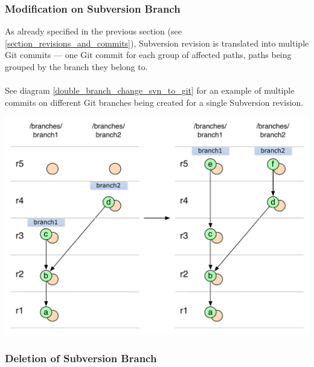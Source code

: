 \subsubsection{Modification on Subversion Branch}

As already specified in the previous section (see \ref{section_revisions_and_commits}), Subversion
revision is translated into multiple Git commits --- one Git commit for each group of 
affected paths, paths being grouped by the branch they belong to.
\\\\
See diagram \ref{double_branch_change_svn_to_git} for an example of multiple commits 
on different Git branches being created for a single Subversion revision.

\begin{center}
\includegraphics[width=\textwidth]{img/diagrams/double_branch_change_svn_to_git.pdf}%
\label{double_branch_change_svn_to_git}%
\end{center}

\subsubsection{Deletion of Subversion Branch}

